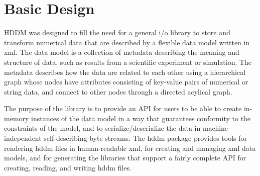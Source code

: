 \documentclass{revtex4}
\begin{document}
%
%
%
%

\section{Basic Design}
HDDM was designed to fill the need for a general i/o library to store
and transform numerical data that are described by a flexible data model
written in xml. The data model is a collection of metadata describing the
meaning and structure of data, such as results from a scientific experiment
or simulation. The metadata describes how the data are related to each
other using a hierarchical graph whose nodes have attributes consisting of
key-value pairs of numerical or string data, and connect to other nodes
through a directed acylical graph.

The purpose of the library is to provide an API for users
to be able to create in-memory instances of the data model in a way that
guarantees conformity to the constraints of the model, and to 
serialize/deserialize the data in machine-independent self-describing
byte streams.  The hddm package provides tools for rendering
hddm files in human-readable xml, for creating and managing xml data models,
and for generating the libraries that support a fairly complete API for
creating, reading, and writing hddm files.
\end{document}
